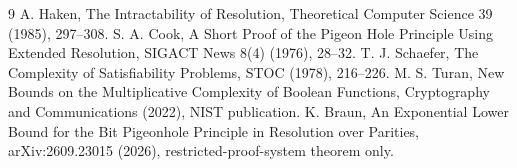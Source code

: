 \documentclass[11pt]{article}
\begin{document}
\begin{thebibliography}{9}
 A. Haken, The Intractability of Resolution, Theoretical Computer Science 39 (1985), 297--308.
 S. A. Cook, A Short Proof of the Pigeon Hole Principle Using Extended Resolution, SIGACT News 8(4) (1976), 28--32.
 T. J. Schaefer, The Complexity of Satisfiability Problems, STOC (1978), 216--226.
 M. S. Turan, New Bounds on the Multiplicative Complexity of Boolean Functions, Cryptography and Communications (2022), NIST publication.
 K. Braun, An Exponential Lower Bound for the Bit Pigeonhole Principle in Resolution over Parities, arXiv:2609.23015 (2026), restricted-proof-system theorem only.
\end{thebibliography}
\end{document}
